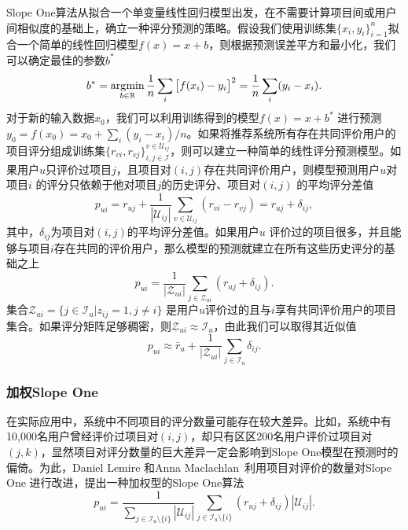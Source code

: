 Slope One算法从拟合一个单变量线性回归模型出发，在不需要计算项目间或用户间相似度的基础上，确立一种评分预测的策略。假设我们使用训练集$\{x_i, y_i\}_{i=1}^n$拟合一个简单的线性回归模型$f(x)=x+b$，则根据预测误差平方和最小化，我们可以确定最佳的参数$b^*$
\begin{equation}
    b^* = \operatorname*{\mathrm{\arg\!\min}}\limits_{b\in \mathbb R} \frac{1}{n}\sum\limits_i \big[f(x_i) - y_i\big]^2 = \frac{1}{n}\sum\limits_i (y_i-x_i).
\end{equation}
对于新的输入数据$x_0$，我们可以利用训练得到的模型$f(x)=x+b^*$ 进行预测$y_0=f(x_0)=x_0+\sum\limits_i(y_i-x_i)/n$。如果将推荐系统所有存在共同评价用户的项目评分组成训练集$\{r_{vi},r_{vj}\}_{i,j\in \mathcal I}^{v\in \mathcal U_{ij}}$，则可以建立一种简单的线性评分预测模型。如果用户$u$只评价过项目$j$，且项目对$(i,j)$存在共同评价用户，则模型预测用户$u$对项目$i$ 的评分只依赖于他对项目$j$的历史评分、项目对$(i,j)$ 的平均评分差值
\begin{equation}
    p_{ui} = r_{uj} + \frac{1}{|\mathcal U_{ij}|} \sum\limits_{v\in \mathcal U_{ij}} (r_{vi} - r_{vj}) = r_{uj} + \delta_{ij},
\end{equation}
其中，$\delta_{ij}$为项目对$(i,j)$的平均评分差值。如果用户$u$ 评价过的项目很多，并且能够与项目$i$存在共同的评价用户，那么模型的预测就建立在所有这些历史评分的基础之上
\begin{equation}\label{eq:slopeone}
    p_{ui} = \frac{1}{|\mathcal Z_{ui}|} \sum\limits_{j\in \mathcal Z_{ui}} (r_{uj} + \delta_{ij}).
\end{equation}
集合$\mathcal Z_{ui}=\{j\in \mathcal I_u|z_{ij}=1, j\ne i\}$ 是用户$u$评价过的且与$i$享有共同评价用户的项目集合。如果评分矩阵足够稠密，则$\mathcal Z_{ui}\approx \mathcal I_u$，由此我们可以取得其近似值
\begin{equation}
    p_{ui} \approx \bar r_u + \frac{1}{|\mathcal Z_{ui}|} \sum\limits_{j\in \mathcal I_u} \delta_{ij}.
\end{equation}

\subsubsection{加权Slope One}
在实际应用中，系统中不同项目的评分数量可能存在较大差异。比如，系统中有10,000名用户曾经评价过项目对$(i,j)$，却只有区区200名用户评价过项目对$(j,k)$，显然项目对评分数量的巨大差异一定会影响到Slope One模型在预测时的偏倚。为此，Daniel Lemire 和Anna Maclachlan~\cite{lemire2005slope}利用项目对评价的数量对Slope One 进行改进，提出一种加权型的Slope One算法
\begin{equation}\label{eq:weightedslopeone}
    p_{ui} = \frac{1}{\sum\limits_{j\in \mathcal I_u\setminus \{i\}} |\mathcal U_{ij}|} \sum\limits_{j\in \mathcal I_u\setminus \{i\}} (r_{uj} + \delta_{ij})|\mathcal U_{ij}| .
\end{equation}

